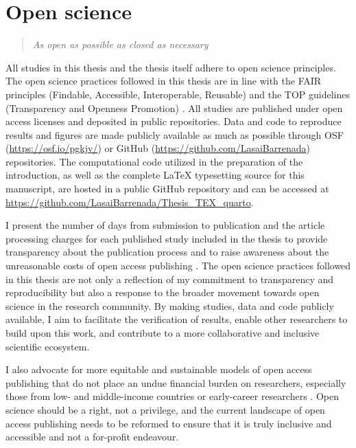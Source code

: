 \section{Open science}
\begin{quote}
    \textit{As open as possible as closed as necessary}
\end{quote}

All studies in this thesis and the thesis itself adhere to open science principles.  The open science practices followed in this thesis are in line with the FAIR principles (Findable, Accessible, Interoperable, Reusable) \cite{wilkinsonFAIRGuidingPrinciples2016} and the TOP guidelines (Transparency and Openness Promotion) \cite{nosekPromotingOpenResearch2015}. All studies are published under open access licenses and deposited in public repositories. Data and code to reproduce results and figures are made publicly available as much as possible through \gls{OSF} (\url{https://osf.io/pgkjv/}) or GitHub (\url{https://github.com/LasaiBarrenada}) repositories. The computational code utilized in the preparation of the introduction, as well as the complete LaTeX typesetting source for this manuscript, are hosted in a public GitHub repository and can be accessed at \url{https://github.com/LasaiBarrenada/Thesis_TEX_quarto}.

I present the number of days from submission to publication and the article processing charges for each published study included in the thesis to provide transparency about the publication process and to raise awareness about the unreasonable costs of open access publishing \cite{zhangShouldOpenAccess2022}. The open science practices followed in this thesis are not only a reflection of my commitment to transparency and reproducibility but also a response to the broader movement towards open science in the research community. By making studies, data and code publicly available, I aim to facilitate the verification of results, enable other researchers to build upon this work, and contribute to a more collaborative and inclusive scientific ecosystem. 

I also advocate for more equitable and sustainable models of open access publishing that do not place an undue financial burden on researchers, especially those from low- and middle-income countries or early-career researchers \cite{kwonOpenaccessPublishingFees2022, smithAssessingEffectArticle2021}. Open science should be a right, not a privilege, and the current landscape of open access publishing needs to be reformed to ensure that it is truly inclusive and accessible and not a for-profit endeavour. 

